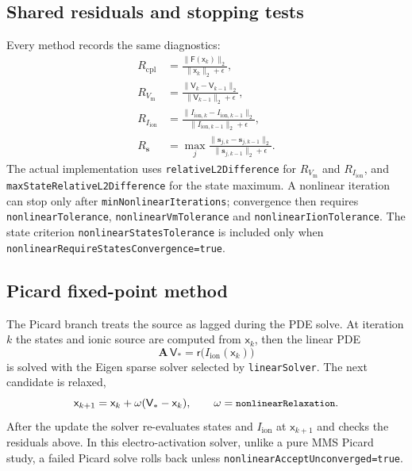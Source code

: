 \documentclass[11pt,a4paper]{article}
\newcommand{\code}[1]{\texttt{\small #1}}
\newcommand{\Vm}{V_{\text{m}}}
\newcommand{\Iion}{I_{\mathrm{ion}}}
\newcommand{\Aimp}{\mathbf{A}}
\newcommand{\Fres}{\mathsf{F}}
\begin{document}
\subsection{Shared residuals and stopping tests}

Every method records the same diagnostics:
\begin{align}
  R_{\mathrm{cpl}} &=
    \frac{\|\Fres(\mathsf{x}_{k})\|_2}
         {\|\mathsf{x}_{k}\|_2+\epsilon},\\
  R_{\Vm} &=
    \frac{\|\mathsf{V}_{k}-\mathsf{V}_{k-1}\|_2}
         {\|\mathsf{V}_{k-1}\|_2+\epsilon},\\
  R_{\Iion} &=
    \frac{\|I_{\mathrm{ion},k}-I_{\mathrm{ion},k-1}\|_2}
         {\|I_{\mathrm{ion},k-1}\|_2+\epsilon},\\
  R_{\mathbf{s}} &=
    \max_j
    \frac{\|\mathbf{s}_{j,k}-\mathbf{s}_{j,k-1}\|_2}
         {\|\mathbf{s}_{j,k-1}\|_2+\epsilon}.
\end{align}
The actual implementation uses \code{relativeL2Difference} for
$R_{\Vm}$ and $R_{\Iion}$, and \code{maxStateRelativeL2Difference} for
the state maximum. A nonlinear iteration can stop only after
\code{minNonlinearIterations}; convergence then requires
\code{nonlinearTolerance}, \code{nonlinearVmTolerance} and
\code{nonlinearIionTolerance}. The state criterion
\code{nonlinearStatesTolerance} is included only when
\code{nonlinearRequireStatesConvergence=true}.

\subsection{Picard fixed-point method}

The Picard branch treats the source as lagged during the PDE solve. At
iteration $k$ the states and ionic source are computed from
$\mathsf{x}_k$, then the linear PDE
\begin{equation}
  \Aimp\,\mathsf{V}_{*}
  =
  \mathsf{r}\!\bigl(\Iion(\mathsf{x}_{k})\bigr)
\end{equation}
is solved with the Eigen sparse solver selected by \code{linearSolver}.
The next candidate is relaxed,
\begin{equation}
  \mathsf{x}_{k+1}
  =
  \mathsf{x}_{k}
  + \omega(\mathsf{V}_{*}-\mathsf{x}_{k}),
  \qquad
  \omega=\code{nonlinearRelaxation}.
\end{equation}
After the update the solver re-evaluates states and $\Iion$ at
$\mathsf{x}_{k+1}$ and checks the residuals above. In this
electro-activation solver, unlike a pure MMS Picard study, a failed
Picard solve rolls back unless \code{nonlinearAcceptUnconverged=true}.
\end{document}
